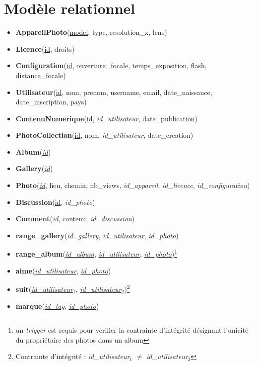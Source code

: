 \documentclass[a4paper,12pt]{article}
\begin{document}
\section{Modèle relationnel}
\begin{itemize}
  \item \textbf{AppareilPhoto}(\underline{model}, type, resolution\_x, lens)
  \item \textbf{Licence}(\underline{id}, droits)
  \item \textbf{Configuration}(\underline{id}, ouverture\_focale, temps\_exposition, flash, distance\_focale)
  \item \textbf{Utilisateur}(\underline{id}, nom, prenom, username, email, date\_naissance, date\_inscription, pays)
  \item \textbf{ContenuNumerique}(\underline{id}, \textit{id\_utilisateur}, date\_publication)
  \item \textbf{PhotoCollection}(\underline{id}, nom, \textit{id\_utilisateur}, date\_creation)
  \item \textbf{Album}(\textit{\underline{id}})
  \item \textbf{Gallery}(\textit{\underline{id}})
  \item \textbf{Photo}(\textit{\underline{id}}, lieu, chemin, nb\_views, \textit{id\_appareil}, \textit{id\_licence}, \textit{id\_configuration})
  \item \textbf{Discussion}(\underline{id}, \textit{id\_photo})
  \item \textbf{Comment}(\textit{\underline{id}}, contenu, \textit{id\_discussion})
  \item \textbf{range\_gallery}(\textit{\underline{id\_gallery}}, \textit{\underline{id\_utilisateur}}, \textit{\underline{id\_photo}})
  \item \textbf{range\_album}(\textit{\underline{id\_album}}, \textit{\underline{id\_utilisateur}}, \textit{\underline{id\_photo}})\footnote{un \textit{trigger} est requis pour vérifier la contrainte d'intégrité désignant l'unicité du propriétaire des photos dans un album}
  \item \textbf{aime}(\textit{\underline{id\_utilisateur}}, \textit{\underline{id\_photo}})
  \item \textbf{suit}(\textit{\underline{id\_utilisateur$_1$}}, \textit{\underline{id\_utilisateur$_2$}})\footnote{Contrainte d'intégrité : \textit{id\_utilisateur$_1$} $\neq$ \textit{id\_utilisateur$_2$}}
  \item \textbf{marque}(\textit{\underline{id\_tag}}, \textit{\underline{id\_photo}})
\end{itemize}
\end{document}
